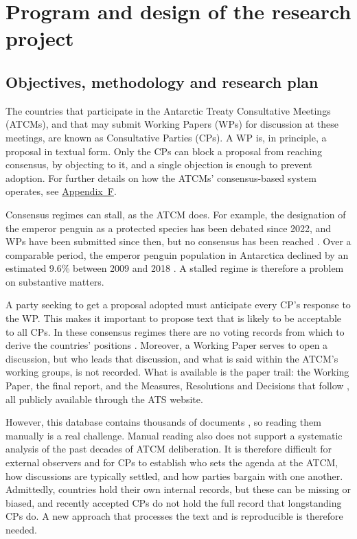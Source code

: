 \chapter{Program and design of the research project}
\label{ch:program}

\section{Objectives, methodology and research plan}
\label{sec:objectives}

The countries that participate in the Antarctic Treaty Consultative Meetings (ATCMs), and that
may submit Working Papers (WPs) for discussion at these meetings, are known as Consultative
Parties (CPs). A WP is, in principle, a proposal in textual form. Only the CPs can block a
proposal from reaching consensus, by objecting to it, and a single objection is enough to prevent
adoption. For further details on how the ATCMs' consensus-based system operates, see \hyperref[app:f]{Appendix~F}.

Consensus regimes can stall, as the ATCM does. For example, the designation of the emperor
penguin as a protected species has been debated since 2022, and WPs have been submitted since
then, but no consensus has been reached
\parencite{ATCM46WP34,ATCM46FinalReport,ATCM47FinalReport}. Over a comparable period, the
emperor penguin population in Antarctica declined by an estimated 9.6\% between 2009 and 2018
\parencite{LaRue2024}. A stalled regime is therefore a problem on substantive matters.

A party seeking to get a proposal adopted must anticipate every CP's response to the WP. This
makes it important to propose text that is likely to be acceptable to all CPs. In these consensus
regimes there are no voting records from which to derive the countries' positions
\parencite{ATS2023RoP}. Moreover, a Working Paper serves to open a discussion, but who leads that
discussion, and what is said within the ATCM's working groups, is not recorded. What is available
is the paper trail: the Working Paper, the final report, and the Measures, Resolutions and
Decisions that follow \parencite{ATCM1995dec1}, all publicly available through the ATS website.

However, this database contains thousands of documents \parencite{Gardiner2024}, so reading them
manually is a real challenge. Manual reading also does not support a systematic analysis of the
past decades of ATCM deliberation. It is therefore difficult for external observers and for CPs
to establish who sets the agenda at the ATCM, how discussions are typically settled, and how
parties bargain with one another. Admittedly, countries hold their own internal records, but
these can be missing or biased, and recently accepted CPs do not hold the full record that
longstanding CPs do. A new approach that processes the text and is reproducible is therefore
needed.

